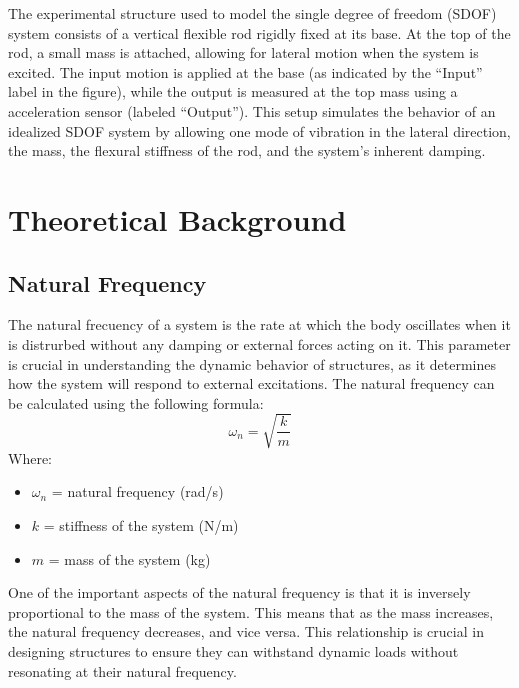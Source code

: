 \documentclass{article}  %
\begin{document}
The experimental structure used to model the single degree of freedom (SDOF) system consists of a vertical flexible rod rigidly fixed at its base. At the top of the rod, a small mass is attached, allowing for lateral motion when the system is excited. The input motion is applied at the base (as indicated by the “Input” label in the figure), while the output is measured at the top mass using a acceleration sensor (labeled “Output”). This setup simulates the behavior of an idealized SDOF system by allowing one mode of vibration in the lateral direction, the mass, the flexural stiffness of the rod, and the system's inherent damping.




\newpage

\section{Theoretical Background}

\subsection{Natural Frequency}
The natural frecuency of a system is the rate at which the body oscillates when it is distrurbed without any damping or external forces acting on it. This parameter is crucial in understanding the dynamic behavior of structures, as it determines how the system will respond to external excitations. The natural frequency can be calculated using the following formula:
\begin{equation}
\omega_n = \sqrt{\frac{k}{m}}
\end{equation}
Where:
\begin{itemize}
  \item $\omega_n$ = natural frequency (rad/s)
  \item $k$ = stiffness of the system (N/m)
  \item $m$ = mass of the system (kg)
\end{itemize}

One of the important aspects of the natural frequency is that it is inversely proportional to the mass of the system. This means that as the mass increases, the natural frequency decreases, and vice versa. This relationship is crucial in designing structures to ensure they can withstand dynamic loads without resonating at their natural frequency.
\end{document}
